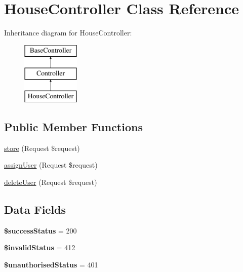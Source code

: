 \hypertarget{class_app_1_1_http_1_1_controllers_1_1_a_p_i_1_1_house_controller}{}\section{House\+Controller Class Reference}
\label{class_app_1_1_http_1_1_controllers_1_1_a_p_i_1_1_house_controller}
Inheritance diagram for House\+Controller\+:\begin{figure}[H]
\begin{center}
\leavevmode
\includegraphics[height=3.000000cm]{class_app_1_1_http_1_1_controllers_1_1_a_p_i_1_1_house_controller}
\end{center}
\end{figure}
\subsection*{Public Member Functions}
\begin{DoxyCompactItemize}
\item 
\mbox{\hyperlink{class_app_1_1_http_1_1_controllers_1_1_a_p_i_1_1_house_controller_a9ef485163104597c12185b53cdacf638}{store}} (Request \$request)
\item 
\mbox{\hyperlink{class_app_1_1_http_1_1_controllers_1_1_a_p_i_1_1_house_controller_a755a44e4534f0223d8efff42766142e5}{assign\+User}} (Request \$request)
\item 
\mbox{\hyperlink{class_app_1_1_http_1_1_controllers_1_1_a_p_i_1_1_house_controller_a69fe13db80c7527ef2b9f5560a3cc6aa}{delete\+User}} (Request \$request)
\end{DoxyCompactItemize}
\subsection*{Data Fields}
\begin{DoxyCompactItemize}
\item 
\mbox{\label{class_app_1_1_http_1_1_controllers_1_1_a_p_i_1_1_house_controller_a4fde01aada3b602338d7002a598a8763}} 
{\bfseries \$success\+Status} = 200
\item 
\mbox{\label{class_app_1_1_http_1_1_controllers_1_1_a_p_i_1_1_house_controller_afce2b73a3afe33067c4398805a121d3c}} 
{\bfseries \$invalid\+Status} = 412
\item 
\mbox{\label{class_app_1_1_http_1_1_controllers_1_1_a_p_i_1_1_house_controller_ab7d5fb8f13267c859829854b90c6f50d}} 
{\bfseries \$unauthorised\+Status} = 401
\end{DoxyCompactItemize}


